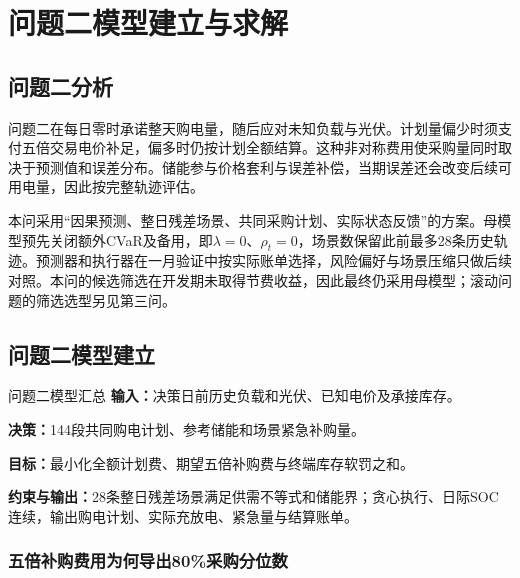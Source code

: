 \section{问题二模型建立与求解}

\subsection{问题二分析}

问题二在每日零时承诺整天购电量，随后应对未知负载与光伏。计划量偏少时须支付五倍交易电价补足，偏多时仍按计划全额结算。这种非对称费用使采购量同时取决于预测值和误差分布。储能参与价格套利与误差补偿，当期误差还会改变后续可用电量，因此按完整轨迹评估。

本问采用“因果预测、整日残差场景、共同采购计划、实际状态反馈”的方案\cite{abunima2022,marino2018,grover2018}。母模型预先关闭额外CVaR及备用，即$\lambda=0$、$\rho_t=0$，场景数保留此前最多28条历史轨迹。预测器和执行器在一月验证中按实际账单选择，风险偏好与场景压缩只做后续对照。本问的候选筛选在开发期未取得节费收益，因此最终仍采用母模型；滚动问题的筛选选型另见第三问。

\subsection{问题二模型建立}

\begin{modelsummary}{问题二模型汇总}
\textbf{输入：}决策日前历史负载和光伏、已知电价及承接库存。\par
\textbf{决策：}144段共同购电计划、参考储能和场景紧急补购量。\par
\textbf{目标：}最小化全额计划费、期望五倍补购费与终端库存软罚之和。\par
\textbf{约束与输出：}28条整日残差场景满足供需不等式和储能界；贪心执行、日际SOC连续，输出购电计划、实际充放电、紧急量与结算账单。
\end{modelsummary}

\subsubsection{五倍补购费用为何导出80\%采购分位数}

